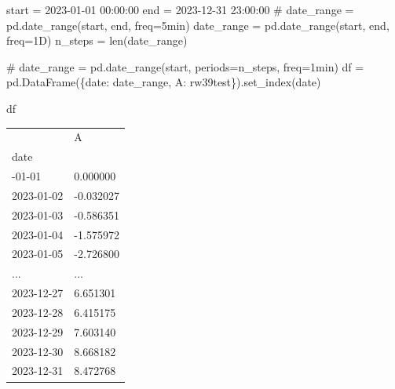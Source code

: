 \documentclass[
  letterpaper,
  DIV=11,
  numbers=noendperiod,
  oneside]{scrreprt}
\newenvironment{Shaded}{\begin{snugshade}}{\end{snugshade}}
\newcommand{\BuiltInTok}[1]{\textcolor[rgb]{0.00,0.23,0.31}{#1}}
\newcommand{\CommentTok}[1]{\textcolor[rgb]{0.37,0.37,0.37}{#1}}
\newcommand{\NormalTok}[1]{\textcolor[rgb]{0.00,0.23,0.31}{#1}}
\newcommand{\OperatorTok}[1]{\textcolor[rgb]{0.37,0.37,0.37}{#1}}
\newcommand{\StringTok}[1]{\textcolor[rgb]{0.13,0.47,0.30}{#1}}
\begin{document}
\begin{Shaded}
\begin{Highlighting}[]
\NormalTok{start }\OperatorTok{=} \StringTok{\textquotesingle{}2023{-}01{-}01 00:00:00\textquotesingle{}}
\NormalTok{end }\OperatorTok{=} \StringTok{\textquotesingle{}2023{-}12{-}31 23:00:00\textquotesingle{}}
\CommentTok{\# date\_range = pd.date\_range(start, end, freq=\textquotesingle{}5min\textquotesingle{})}
\NormalTok{date\_range }\OperatorTok{=}\NormalTok{ pd.date\_range(start, end, freq}\OperatorTok{=}\StringTok{\textquotesingle{}1D\textquotesingle{}}\NormalTok{)}
\NormalTok{n\_steps }\OperatorTok{=} \BuiltInTok{len}\NormalTok{(date\_range)}
\end{Highlighting}
\end{Shaded}

\begin{Shaded}
\begin{Highlighting}[]
\CommentTok{\# date\_range = pd.date\_range(start, periods=n\_steps, freq=\textquotesingle{}1min\textquotesingle{})}
\NormalTok{df }\OperatorTok{=}\NormalTok{ pd.DataFrame(\{}\StringTok{\textquotesingle{}date\textquotesingle{}}\NormalTok{: date\_range, }\StringTok{\textquotesingle{}A\textquotesingle{}}\NormalTok{: rw39test\}).set\_index(}\StringTok{\textquotesingle{}date\textquotesingle{}}\NormalTok{)}
\end{Highlighting}
\end{Shaded}

\begin{Shaded}
\begin{Highlighting}[]
\NormalTok{df}
\end{Highlighting}
\end{Shaded}

\begin{longtable}[]{@{}ll@{}}
\toprule\noalign{}
& A \\
date & \\
\midrule\noalign{}
\endhead
\bottomrule\noalign{}
\endlastfoot
2023-01-01 & 0.000000 \\
2023-01-02 & -0.032027 \\
2023-01-03 & -0.586351 \\
2023-01-04 & -1.575972 \\
2023-01-05 & -2.726800 \\
... & ... \\
2023-12-27 & 6.651301 \\
2023-12-28 & 6.415175 \\
2023-12-29 & 7.603140 \\
2023-12-30 & 8.668182 \\
2023-12-31 & 8.472768 \\
\end{longtable}
\end{document}
